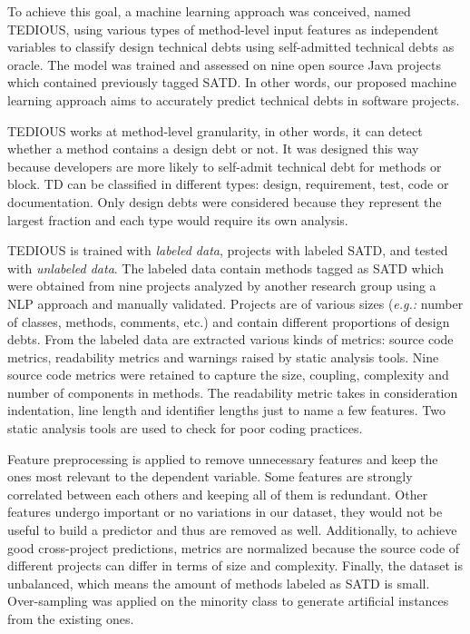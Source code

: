 To achieve this goal, a machine learning approach was conceived, named \ac{TEDIOUS}, using various types of method-level input features as independent variables to classify design technical debts using self-admitted technical debts as oracle. The model was trained and assessed on nine open source Java projects which contained previously tagged \ac{SATD}. In other words, our proposed machine learning approach aims to accurately predict technical debts in software projects. \par

\ac{TEDIOUS} works at method-level granularity, in other words, it can detect whether a method contains a design debt or not. It was designed this way because developers are more likely to self-admit technical debt for methods or block. \ac{TD} can be classified in different types: design, requirement, test, code or documentation. Only design debts were considered because they represent the largest fraction and each type would require its own analysis.  \par

\ac{TEDIOUS} is trained with \emph{labeled data}, projects with labeled \ac{SATD}, and tested with \emph{unlabeled data}. The labeled data contain methods tagged as \ac{SATD} which were obtained from nine projects analyzed by another research group using a \ac{NLP} approach and manually validated. Projects are of various sizes (\emph{e.g.:} number of classes, methods, comments, etc.) and contain different proportions of design debts. From the labeled data are extracted various kinds of metrics: source code metrics, readability metrics and warnings raised by static analysis tools. Nine source code metrics were retained to capture the size, coupling, complexity and number of components in methods. The readability metric takes in consideration indentation, line length and identifier lengths just to name a few features. Two static analysis tools are used to check for poor coding practices. \par

Feature preprocessing is applied to remove unnecessary features and keep the ones most relevant to the dependent variable. Some features are strongly correlated between each others and keeping all of them is redundant. Other features undergo important or no variations in our dataset, they would not be useful to build a predictor and thus are removed as well. Additionally, to achieve good cross-project predictions, metrics are normalized because the source code of different projects can differ in terms of size and complexity. Finally, the dataset is unbalanced, which means the amount of methods labeled as \ac{SATD} is small. Over-sampling was applied on the minority class to generate artificial instances from the existing ones. \par

